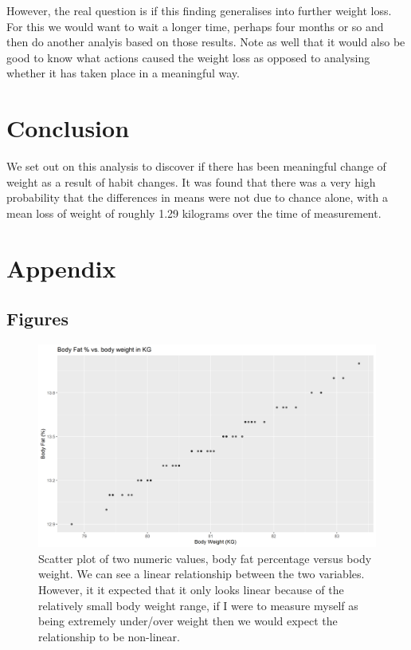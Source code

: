 \documentclass[journal, a4paper]{IEEEtran}
\begin{document}
However, the real question is if this finding generalises into further weight loss. For this we would want to wait a longer time, perhaps four months or so and
then do another analyis based on those results. Note as well that it would also be good to know what actions caused the weight loss as opposed to analysing 
whether it has taken place in a meaningful way.

\section{Conclusion}

We set out on this analysis to discover if there has been meaningful change of weight as a result of habit changes. It was found that there was a very high 
probability that the differences in means were not due to chance alone, with a mean loss of weight of roughly 1.29 kilograms over the time of measurement. 

\newpage
\onecolumn

\section{Appendix}

\subsection{Figures}

\begin{figure}[h!]
	\includegraphics[width=\linewidth]{../plots/01_bf_vs_bw.png}
	\caption{Scatter plot of two numeric values, body fat percentage versus body weight. We can see a linear relationship between the two variables. However,
	it it expected that it only looks linear because of the relatively small body weight range, if I were to measure myself as being extremely under/over weight
	then we would expect the relationship to be non-linear.}
	\label{fig:1}
\end{figure}
\end{document}
